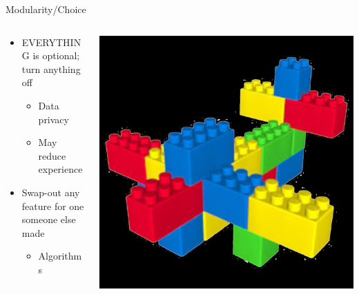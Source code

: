 \documentclass[aspectratio=169]{beamer}
\begin{document}
\begin{frame}{Modularity/Choice}
\begin{columns}[T]
    \begin{column}[T]{0.5\textwidth}
        \begin{itemize}
            \item EVERYTHING is optional; \\turn anything off
            \begin{itemize}
                \item Data privacy
                \item May reduce experience
            \end{itemize}
            \item Swap-out any feature for one someone else made
            \begin{itemize}
                \item Algorithms
            \end{itemize}
        \end{itemize}
    \end{column}
    \begin{column}{0.5\textwidth}
        \includegraphics[height=0.8\textheight]{imgs/power_to_people/legos.png}
    \end{column}
\end{columns}
\end{frame}
\end{document}
